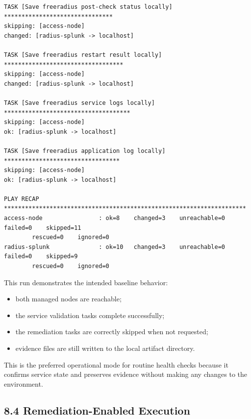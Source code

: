 \documentclass[11pt]{article}
\begin{document}
\begin{verbatim}
TASK [Save freeradius post-check status locally] *******************************
skipping: [access-node]
changed: [radius-splunk -> localhost]

TASK [Save freeradius restart result locally] **********************************
skipping: [access-node]
changed: [radius-splunk -> localhost]

TASK [Save freeradius service logs locally] ************************************
skipping: [access-node]
ok: [radius-splunk -> localhost]

TASK [Save freeradius application log locally] *********************************
skipping: [access-node]
ok: [radius-splunk -> localhost]

PLAY RECAP *********************************************************************
access-node                : ok=8    changed=3    unreachable=0    failed=0    skipped=11   
        rescued=0    ignored=0
radius-splunk              : ok=10   changed=3    unreachable=0    failed=0    skipped=9    
        rescued=0    ignored=0
\end{verbatim}

This run demonstrates the intended baseline behavior:

\begin{itemize}
    \item both managed nodes are reachable;
    \item the service validation tasks complete successfully;
    \item the remediation tasks are correctly skipped when not requested;
    \item evidence files are still written to the local artifact directory.
\end{itemize}

This is the preferred operational mode for routine health checks because it confirms service state and preserves evidence without making any changes to the environment.


\subsection{8.4 Remediation-Enabled Execution}
\label{sec:remediation-enabled-execution}
\end{document}
